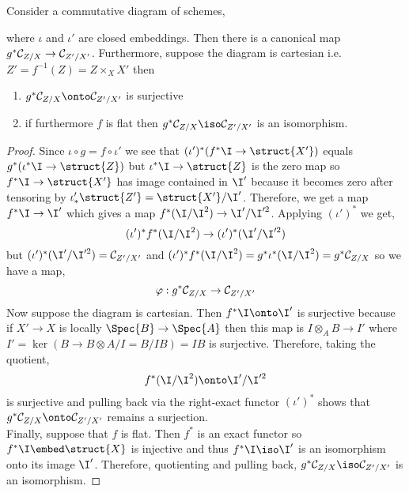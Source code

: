 \documentclass[12pt]{article}
\begin{document}
\begin{lemma}
Consider a commutative diagram of schemes,
\begin{center}
\end{center}
where $\iota$ and $\iota'$ are closed embeddings. Then there is a canonical map $g^* \mathcal{C}_{Z/X} \to \mathcal{C}_{Z'/X'}$. Furthermore, suppose the diagram is cartesian i.e. $Z' = f^{-1}(Z) = Z \times_X X'$ then
\begin{enumerate}
\item $g^* \C_{Z/X} \onto \C_{Z'/X'}$ is surjective
\item if furthermore $f$ is flat then $g^* \C_{Z/X} \iso \C_{Z'/X'}$ is an isomorphism.
\end{enumerate}
\end{lemma}

\begin{proof}
Since $\iota \circ g = f \circ \iota'$ we see that $(\iota')^* (f^* \I \to \struct{X'})$ equals $g^* (\iota^* \I \to \struct{Z})$ but $\iota^* \I \to \struct{Z}$ is the zero map  so $f^* \I \to \struct{X'}$ has image contained in $\I'$ because it becomes zero after tensoring by $\iota'_* \struct{Z'} = \struct{X'} / \I'$. Therefore, we get a map $f^* \I \to \I'$ which gives a map $f^* (\I / \I^2) \to \I' / \I'^2$. Applying $(\iota')^*$ we get,
\[ (\iota')^* f^* (\I/\I^2) \to (\iota')^* (\I' /  \I'^2) \]
but $(\iota')^* (\I' /  \I'^2) = \C_{Z'/X'}$ and $(\iota')^* f^* (\I/\I^2) = g^* \iota^* (\I / \I^2) = g^* \C_{Z/X}$ so we have a map,
\[ \varphi : g^* \mathcal{C}_{Z/X} \to \mathcal{C}_{Z'/X'} \]
Now suppose the diagram is cartesian. Then $f^* \I \onto \I'$ is surjective because if $X' \to X$ is locally $\Spec{B} \to \Spec{A}$ then this map is $I \otimes_A B \to I'$ where $I' = \ker{(B \to B \otimes A / I = B / IB)} = IB$ is surjective. Therefore, taking the quotient,
\[ f^* (\I/\I^2) \onto \I' /  \I'^2 \]
is surjective and pulling back via the right-exact functor $(\iota')^*$ shows that $g^* \C_{Z/X} \onto \C_{Z'/X'}$ remains a surjection.
\bigskip\\
Finally, suppose that $f$ is flat. Then $f^*$ is an exact functor so $f^* \I \embed \struct{X}$ is injective and thus $f^* \I \iso \I'$ is an isomorphism onto its image $\I'$. Therefore, quotienting and pulling back, $g^* \C_{Z/X} \iso \C_{Z'/X'}$ is an isomorphism.
\end{proof}
\end{document}
